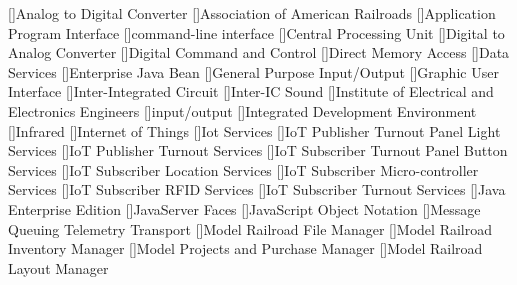 \relax 
\providecommand\hyper@newdestlabel[2]{}
[]{Analog to Digital Converter}
[]{Association of American Railroads}
[]{Application Program Interface}
[]{command-line interface}
[]{Central Processing Unit}
[]{Digital to Analog Converter}
[]{Digital Command and Control}
[]{Direct Memory Access}
[]{Data Services}
[]{Enterprise Java Bean}
[]{General Purpose Input/Output}
[]{Graphic User Interface}
[]{Inter-Integrated Circuit}
[]{Inter-IC Sound}
[]{Institute of Electrical and Electronics Engineers}
[]{input/output}
[]{Integrated Development Environment}
[]{Infrared}
[]{Internet of Things}
[]{Iot Services}
[]{IoT Publisher Turnout Panel Light Services}
[]{IoT Publisher Turnout Services}
[]{IoT Subscriber Turnout Panel Button Services}
[]{IoT Subscriber Location Services}
[]{IoT Subscriber Micro-controller Services}
[]{IoT Subscriber RFID Services}
[]{IoT Subscriber Turnout Services}
[]{Java Enterprise Edition}
[]{JavaServer Faces}
[]{JavaScript Object Notation}
[]{Message Queuing Telemetry Transport}
[]{Model Railroad File Manager}
[]{Model Railroad Inventory Manager}
[]{Model Projects and Purchase Manager}
[]{Model Railroad Layout Manager}
